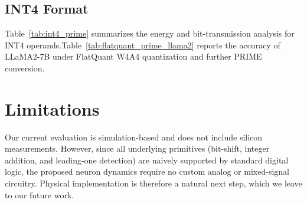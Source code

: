 \subsection{INT4 Format}

Table~\ref{tab:int4_prime} summarizes the energy and bit-transmission analysis for INT4 operands.Table~\ref{tab:flatquant_prime_llama2} reports the accuracy of LLaMA2-7B under FlatQuant W4A4 quantization and further PRIME conversion.
\begin{table}[htbp]
  \centering
  \scriptsize
  \caption{Energy and bit-transmission cost of INT4 format after PRIME conversion.}
  \label{tab:int4_prime}
\end{table}



\begin{table}[htbp]
  \centering
  \scriptsize
  \caption{Accuracy comparison of FlatQuant W4A4 and further PRIME conversion on LLaMA2-7B.}
  \label{tab:flatquant_prime_llama2}
\end{table}




\section{Limitations}
Our current evaluation is simulation-based and does not include silicon measurements. However, since all underlying primitives (bit-shift, integer addition, and leading-one detection) are naively supported by standard digital logic, the proposed neuron dynamics require no custom analog or mixed-signal circuitry. Physical implementation is therefore a natural next step, which we leave to our future work.